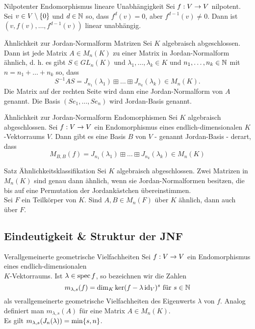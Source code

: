 \documentclass[main.tex]{subfiles}
\begin{document}
\begin{karte}{Nilpotenter Endomorphismus lineare Unabhängigkeit}
    Sei \(f : V \rightarrow V\) nilpotent. Sei \(v \in V\setminus \{0\}\)
    und \(d \in \mathbb{N}\) so, dass \(f^d(v) = 0\), aber \(f^{d-1}(v) \neq 0\).
    Dann ist \((v,f(v),\ldots, f^{d-1}(v))\) linear unabhängig.
\end{karte}

\begin{karte}{Ähnlichkeit zur Jordan-Normalform Matrizen}
    Sei \(K\) algebraisch abgeschlossen. Dann ist jede Matrix \(A \in M_n(K)\)
    zu einer Matrix in Jordan-Normalform ähnlich, d. h. es gibt \(S \in GL_n(K)\)
    und \(\lambda_1, \ldots, \lambda_k \in K\) und \(n_1, \ldots, n_k \in \mathbb{N}\)
    mit \(n = n_1 + \ldots + n_k\) so, dass
    \[ S^{-1}AS = J_{n_1}(\lambda_1) \boxplus \ldots \boxplus 
    J_{n_k}(\lambda_k) \in M_n(K). \]
    Die Matrix auf der rechten Seite wird dann eine Jordan-Normalform von \(A\)
    genannt. Die Basis \((Se_1, \ldots, Se_n)\) wird Jordan-Basis genannt.
\end{karte}

\begin{karte}{Ähnlichkeit zur Jordan-Normalform Endomorphismen}
    Sei \(K\) algebraisch abgeschlossen. Sei \(f : V \rightarrow V\) ein Endomorphismus
    eines endlich-dimensionalen \(K\)-Vektorraums \(V\). Dann gibt es eine Basis
    \(B\) von \(V\) - genannt Jordan-Basis - derart, dass
    \[ M_ {B,B}(f) = J_{n_1}(\lambda_1) \boxplus \ldots \boxplus J_{n_k}(\lambda_k)
    \in M_n(K) \]
\end{karte}

\begin{karte}{Satz Ähnlichkeitsklassifikation}
    Sei \(K\) algebraisch abgeschlossen. Zwei Matrizen in \(M_n(K)\) sind genau dann 
    ähnlich, wenn sie Jordan-Normalformen besitzen, die bis auf eine Permutation der 
    Jordankästchen übereinstimmen.\\
    Sei \(F\) ein Teilkörper von \(K\). Sind \(A, B \in M_n(F)\) über \(K\)
    ähnlich, dann auch über \(F\).
\end{karte}

\subsection*{Eindeutigkeit \& Struktur der JNF}

\begin{karte}{Verallgemeinerte geometrische Vielfachheiten}
    Sei \(f : V \rightarrow V\) ein Endomorphismus eines endlich-dimensionalen \\
    \(K\)-Vektorraums. Ist \(\lambda \in \operatorname{spec} f\), so bezeichnen wir die Zahlen
    \[ m_{\lambda, s}(f) = \dim_K \ker(f-\lambda \operatorname{id}_V)^s \text{ für } s \in \mathbb{N} \]
    als verallgemeinerte geometrische Vielfachheiten des Eigenwerts
    \(\lambda\) von \(f\). Analog definiert man \(m_{\lambda, s}(A)\) für eine Matrix
    \(A \in M_n(K)\).\\
    Es gilt \(m_{\lambda, s}(J_n(\lambda)) = \min\{s,n\}\).
\end{karte}
\end{document}
